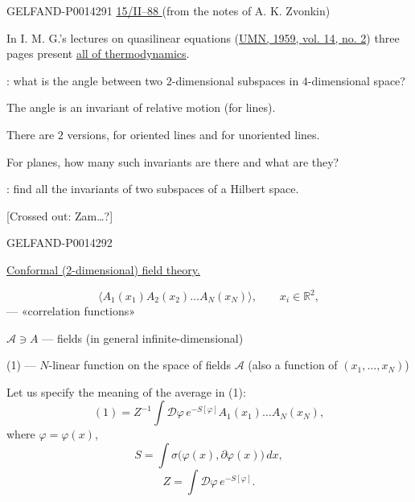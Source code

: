 \begin{GelfandAdjacentEvidence}{GELFAND-P001429}{1}
\uline{15/II--88 }\qquad {}
(from the notes of A. K. Zvonkin)

In I. M. G.'s lectures on quasilinear equations
(\href{https://www.mathnet.ru/eng/rm7290}{UMN, 1959, vol. 14, no. 2})
three pages present \uline{all of thermodynamics}.

: what is the angle between two \(2\)-dimensional subspaces in \(4\)-dimensional space?

The angle is an invariant of relative motion (for lines).

There are \(2\) versions, for oriented lines and for unoriented lines.

For planes, how many such invariants are there and what are they?

: find all the invariants of two subspaces of a Hilbert space.

[Crossed out: Zam\ldots{}?]
\end{GelfandAdjacentEvidence}
\begin{GelfandAdjacentEvidence}{GELFAND-P001429}{2}


\qquad
\uline{Conformal (2-dimensional) field theory.}

\begin{equation*}
\tag{1}
\langle A_1(x_1)A_2(x_2)\ldots A_N(x_N)\rangle,\qquad x_i\in\mathbb R^2,
\end{equation*}
— «correlation functions»

\(\mathcal A\ni A\) — fields (in general infinite-dimensional)

(1) — \(N\)-linear function on the space of fields \(\mathcal A\)
(also a function of \((x_1,\ldots,x_N)\))

Let us specify the meaning of the average in (1):
\begin{equation*}
\tag{2}
(1)=Z^{-1}\int\mathcal D\varphi\, e^{-S[\varphi]}A_1(x_1)\ldots A_N(x_N),
\end{equation*}
where \(\varphi=\varphi(x)\),
\begin{equation*}
\tag{3}
S=\int\sigma\bigl(\varphi(x),\partial\varphi(x)\bigr)\,dx,
\end{equation*}
\begin{equation*}
\tag{4}
Z=\int\mathcal D\varphi\,e^{-S[\varphi]}.
\end{equation*}
\end{GelfandAdjacentEvidence}
